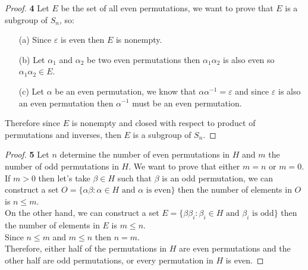 \documentclass[11pt]{article}
\begin{document}
		\begin{proof}{\textbf{4}}
			Let $E$ be the set of all even permutations, we want to prove that
			$E$ is a subgroup of $S_n$, so:
			\begin{itemize}
				\item [(a)] Since $\varepsilon$ is even then $E$ is nonempty.
				\item [(b)] Let $\alpha_1$ and $\alpha_2$ be two even
				permutations then $\alpha_1\alpha_2$ is also even so
				$\alpha_1\alpha_2 \in E$.
				\item [(c)] Let $\alpha$ be an even permutation, we know that
				$\alpha\alpha^{-1}=\varepsilon$ and since $\varepsilon$ is also
				an even permutation then $\alpha^{-1}$ must be an even permutation.
			\end{itemize}
			Therefore since $E$ is nonempty and closed with respect to product
			of permutations and inverses, then $E$ is a subgroup of $S_n$. 
		\end{proof}
		\begin{proof}{\textbf{5}}
			Let $n$ determine the number of even permutations in $H$ and $m$
			the number of odd permutations in $H$. We want to prove that either
			$m=n$ or $m=0$.\\
			If $m > 0$ then let's take $\beta \in H$ such that $\beta$ is an
			odd permutation, we can construct a set
			$O = \{\alpha\beta : \alpha \in H\text{ and }\alpha\text{ is even}\}$
			then the number of elements in $O$ is $n \leq m$.\\
			On the other hand, we can construct a set
			$E = \{\beta\beta_i : \beta_i \in H\text{ and }\beta_i\text{ is odd}\}$
			then the number of elements in $E$ is $m \leq n$.\\
			Since $n \leq m$ and $m \leq n$ then $n=m$.\\
			Therefore, either half of the permutations in $H$ are even permutations
			and the other half are odd permutations, or every permutation in $H$
			is even.
		\end{proof}
\end{document}
